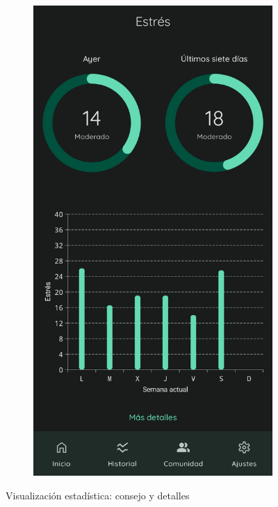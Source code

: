 \begin{figure}[htbp]
\begin{subfigure}[c]{0.4\textwidth}
                    \includegraphics[width=1\linewidth]{figures/pruebas/visualizacion_individual/Medida estres.png}
                \end{subfigure}
                \caption{Visualización estadística: consejo y detalles}
                \label{figure:pruebas:visualizacion_individual:detalles}
            \end{figure}
            
